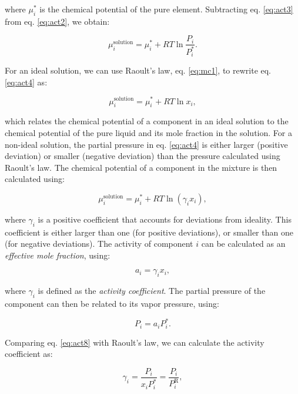 \documentclass[
  9pt,
]{extbook}
\theoremstyle{definition}
\theoremstyle{definition}
\theoremstyle{definition}
\theoremstyle{definition}
\theoremstyle{remark}
\begin{document}
where \(\mu_i^*\) is the chemical potential of the pure element. Subtracting eq. \eqref{eq:act3} from eq. \eqref{eq:act2}, we obtain:

\begin{equation}
\mu_i^{\text{solution}} = \mu_i^* + RT \ln \frac{P_i}{P^*_i}.
\label{eq:act4}
\end{equation}

For an ideal solution, we can use Raoult's law, eq. \eqref{eq:mc1}, to rewrite eq. \eqref{eq:act4} as:

\begin{equation}
\mu_i^{\text{solution}} = \mu_i^* + RT \ln x_i,
\label{eq:act5}
\end{equation}

which relates the chemical potential of a component in an ideal solution to the chemical potential of the pure liquid and its mole fraction in the solution. For a non-ideal solution, the partial pressure in eq. \eqref{eq:act4} is either larger (positive deviation) or smaller (negative deviation) than the pressure calculated using Raoult's law. The chemical potential of a component in the mixture is then calculated using:

\begin{equation}
\mu_i^{\text{solution}} = \mu_i^* + RT \ln \left(\gamma_i x_i\right),
\label{eq:act6}
\end{equation}

where \(\gamma_i\) is a positive coefficient that accounts for deviations from ideality. This coefficient is either larger than one (for positive deviations), or smaller than one (for negative deviations). The activity of component \(i\) can be calculated as an \emph{effective mole fraction}, using:

\begin{equation}
a_i = \gamma_i x_i,
\label{eq:act7}
\end{equation}

where \(\gamma_i\) is defined as the \emph{activity coefficient}. The partial pressure of the component can then be related to its vapor pressure, using:

\begin{equation}
P_i = a_i P_i^*.
\label{eq:act8}
\end{equation}

Comparing eq. \eqref{eq:act8} with Raoult's law, we can calculate the activity coefficient as:

\begin{equation}
\gamma_i = \frac{P_i}{x_i P_i^*} = \frac{P_i}{P_i^{\text{R}}},
\label{eq:act9}
\end{equation}
\end{document}
